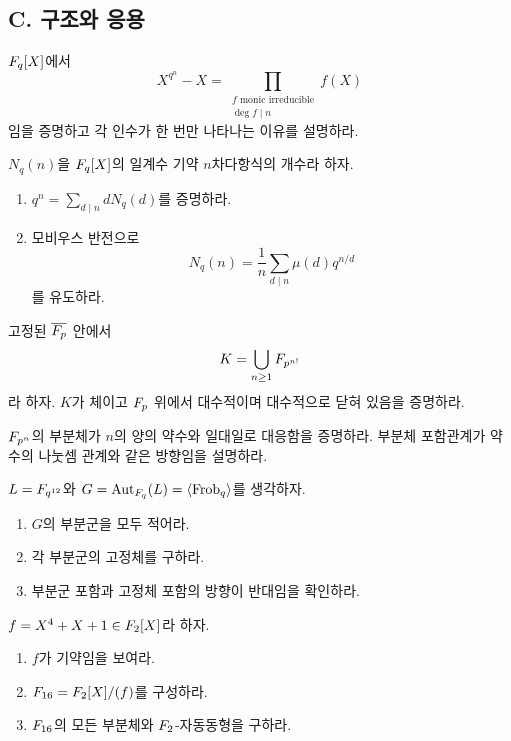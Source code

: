 \subsection*{C. 구조와 응용}

\begin{exercise}
$F_q[X]$에서
\[
  X^{q^n}-X
  =\prod_{\substack{f\text{ monic irreducible}\\\deg f\mid n}}f(X)
\]
임을 증명하고 각 인수가 한 번만 나타나는 이유를 설명하라.
\end{exercise}

\begin{exercise}[*]
$N_q(n)$을 $F_q[X]$의 일계수 기약 $n$차다항식의 개수라 하자.
\begin{enumerate}[label=(\alph*)]
  \item $q^n=\sum_{d\mid n}dN_q(d)$를 증명하라.
  \item 모비우스 반전으로
  \[
    N_q(n)=\frac1n\sum_{d\mid n}\mu(d)q^{n/d}
  \]
  를 유도하라.
\end{enumerate}
\end{exercise}

\begin{exercise}[*]
고정된 $\overline{F_p}$ 안에서
\[
  K=\bigcup_{n\ge1}F_{p^{n!}}
\]
라 하자. $K$가 체이고 $F_p$ 위에서 대수적이며 대수적으로 닫혀 있음을 증명하라.
\end{exercise}

\begin{exercise}
$F_{p^n}$의 부분체가 $n$의 양의 약수와 일대일로 대응함을 증명하라. 부분체 포함관계가 약수의 나눗셈 관계와 같은 방향임을 설명하라.
\end{exercise}

\begin{exercise}[*]
$L=F_{q^{12}}$와 $G=\operatorname{Aut}_{F_q}(L)=\langle\operatorname{Frob}_q\rangle$를 생각하자.
\begin{enumerate}[label=(\alph*)]
  \item $G$의 부분군을 모두 적어라.
  \item 각 부분군의 고정체를 구하라.
  \item 부분군 포함과 고정체 포함의 방향이 반대임을 확인하라.
\end{enumerate}
\end{exercise}

\begin{exercise}
$f=X^4+X+1\in F_2[X]$라 하자.
\begin{enumerate}[label=(\alph*)]
  \item $f$가 기약임을 보여라.
  \item $F_{16}=F_2[X]/(f)$를 구성하라.
  \item $F_{16}$의 모든 부분체와 $F_2$-자동동형을 구하라.
\end{enumerate}
\end{exercise}

